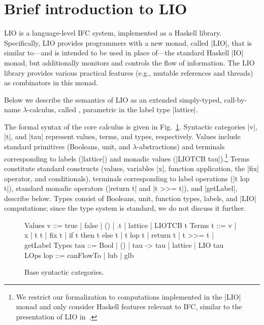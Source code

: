 \section{Brief introduction to LIO}
\label{sec:background}

LIO is a language-level IFC system, implemented as a Haskell
library.
%
Specifically, LIO provides programmers with a new monad, called |LIO|,
that is similar to---and is intended to be used in place of---the
standard Haskell |IO| monad, but additionally monitors and controls
the flow of information.
%
The LIO library provides various practical features (e.g., mutable
references and threads) as combinators in this monad.


%
Below we describe the semantics of LIO as an extended simply-typed,
call-by-name $\lambda$-calculus, called \lio, parametric in the label
type |lattice|.

The formal syntax of the core \lio{} calculus is given in
Fig.~\ref{fig:language:base}.
%
Syntactic categories |v|, |t|, and |tau| represent values, terms, and
types, respectively.
%
Values include standard primitives (Booleans, unit,
and $\lambda$-abstractions) and terminals corresponding to labels
(|lattice|) and monadic values (|LIOTCB tau|).\footnote{
We restrict our formalization to computations implemented in the |LIO|
monad and only consider Haskell features relevant to IFC, similar to
the presentation of LIO in~.
}
%
Terms constitute standard constructs (values, variables |x|, function
application, the |fix| operator, and conditionals), terminals
corresponding to label operations (|t lop t|), standard monadic
operators (|return t| and |t >>= t|), and |getLabel|, describe below.
%
Types consist of Booleans, unit, function types, labels, and |LIO|
computations; since the \lio{} type system is standard, we do not
discuss it further.

\begin{figure}
\centering
\begin{code}
Values  v    ::=  true | false | () | \x.t | lattice | LIOTCB t
Terms   t    ::=  v | x | t t | fix t | if t then t else t
               |  t lop t | return t | t >>= t | getLabel
Types   tau  ::=  Bool | () | tau -> tau | lattice | LIO tau  
LOps    lop  ::=  canFlowTo | lub | glb
\end{code}
\caption{Base \lio{} syntactic categories.
\label{fig:language:base}}
\end{figure}

